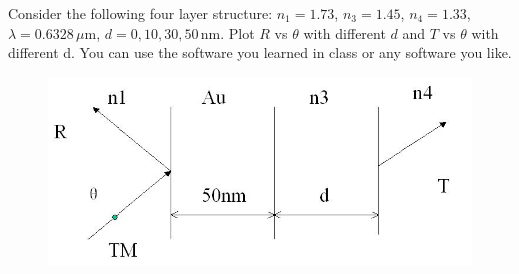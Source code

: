 \documentclass{assignment}
\begin{document}
\begin{prob}
    Consider the following four layer structure: $n_1=1.73$, $n_3=1.45$, $n_4=1.33$, $\lambda=0.6328\,\mu\mathrm{m}$, $d=0,10,30,50\,\mathrm{nm}$. Plot $R$ vs $\theta$ with different $d$ and $T$ vs $\theta$ with different d. You can use the software you learned in class or any software you like.
    \begin{figure}[h]
        \centering
        \includegraphics[width=.5\columnwidth]{A-3.jpg}
    \end{figure}
\end{prob}
\end{document}
